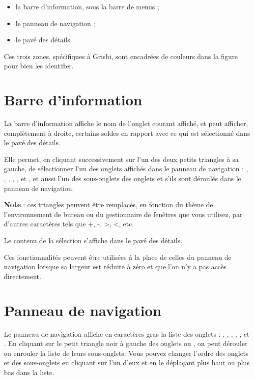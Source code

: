 \begin{itemize}
	 \item la barre d'information, sous la barre de menus ;
	 \item le panneau de navigation ;
	 \item le pavé des détails.
\end{itemize}

\ifIllustration 
Ces trois zones, spécifiques à Grisbi, sont encadrées de couleurs dans la figure pour bien les identifier.
\else
\fi


\section{Barre d'information\label{home-synthesis}}


La barre d'information affiche le nom de l'onglet courant affiché, et peut afficher, complètement à droite, certains soldes en rapport avec ce qui est sélectionné dans le pavé des détails.

Elle permet, en cliquant successivement sur l'un des deux petits triangles à sa gauche, de sélectionner l'un des onglets affichés dans le panneau de navigation  : , , , , ,  et , et aussi l'un des sous-onglets des onglets  et  s'ils sont déroulés dans le panneau de navigation.

\textbf{Note} : ces triangles peuvent être remplacés, en fonction du thème de l'environnement de bureau ou du gestionnaire de fenêtres que vous utilisez, par d'autres caractères tels que +, -, >, <, etc.

Le contenu de la sélection s'affiche dans le pavé des détails.

Ces fonctionnalités peuvent être utilisées à la place de celles du panneau de navigation lorsque sa largeur est réduite à zéro et que l'on n'y a pas accès directement.


\section{Panneau de navigation\label{home-accounting}}


Le panneau de navigation affiche en caractères gras la liste des onglets : , , , , ,  et . En cliquant sur le petit triangle noir à gauche des onglets  ou , on peut dérouler ou enrouler la liste de leurs sous-onglets. Vous pouvez changer l'ordre des onglets et des sous-onglets en cliquant sur l'un d'eux et en le déplaçant plus haut ou plus bas dans la liste.

